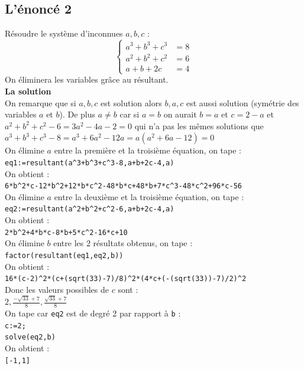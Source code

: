 \documentclass[a4paper,11pt]{book}
\begin{document}
\subsection{L'\'enonc\'e 2}
R\'esoudre le syst\`eme d'inconnues $a,b,c$ :
$$\left\{\begin{array}{rl}
a^3+b^3+c^3&=8\\
a^2+b^2+c^2&=6\\
a+b+2c&=4
\end{array}
\right.
$$
On \'eliminera les variables gr\^ace au r\'esultant.\\
{\bf La solution}\\
On remarque que si $a,b,c$ est solution alors $b,a,c$ est aussi solution 
(sym\'etrie des variables $a$ et $b$). De plus $a\neq b$ car si $a=b$ on aurait
$b=a$ et $c=2-a$  et $a^2+b^2+c^2-6=3a^2-4a-2=0$ qui n'a pas les m\^emes 
solutions que $a^3+b^3+c^3-8=a^3+6a^2-12a=a(a^2+6a-12)=0$\\
On \'elimine $a$ entre la premi\`ere et la troisi\`eme \'equation, on tape :\\
{\tt eq1:=resultant(a\verb|^|3+b\verb|^|3+c\verb|^|3-8,a+b+2c-4,a)}\\
On obtient :\\
{\tt 6*b\verb|^|2*c-12*b\verb|^|2+12*b*c\verb|^|2-48*b*c+48*b+7*c\verb|^|3-48*c\verb|^|2+96*c-56}\\
On \'elimine $a$ entre la deuxi\`eme et la troisi\`eme \'equation, on tape :\\
{\tt eq2:=resultant(a\verb|^|2+b\verb|^|2+c\verb|^|2-6,a+b+2c-4,a)}\\
On obtient :\\
{\tt 2*b\verb|^|2+4*b*c-8*b+5*c\verb|^|2-16*c+10}\\
On \'elimine $b$ entre les 2 r\'esultats obtenus, on tape :\\
{\tt factor(resultant(eq1,eq2,b))}\\
On obtient :\\
{\tt 16*(c-2)\verb|^|2*(c+(sqrt(33)-7)/8)\verb|^|2*(4*c+(-(sqrt(33))-7)/2)\verb|^|2}\\
Donc les valeurs possibles de $c$ sont :\\
$\displaystyle 2,\frac{-\sqrt{33}+7}{8},\frac{\sqrt{33}+7}{8}$ \\
On tape car {\tt eq2} est de degr\'e 2 par rapport \`a {\tt b} :\\
{\tt c:=2;}\\
{\tt solve(eq2,b)}\\
On obtient :\\
{\tt [-1,1]}\\
\end{document}
